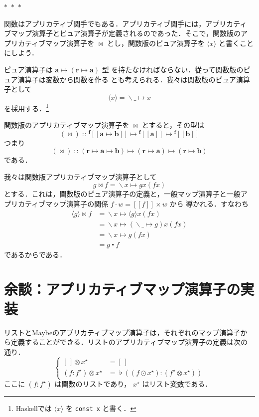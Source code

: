 \documentclass[a5paper,twoside,fleqn,draft]{jsbook}
\def\[{[\![}
\def\]{]\!]}
\newcommand{\separator}{\begin{center}$*$~$*$~$*$\end{center}}
\newcommand{\programminglanguage}[1]{\textsf{#1}}
\newcommand{\haskell}{\programminglanguage{Haskell}}
\newcommand{\code}[1]{\texttt{#1}}
\newcommand{\mEmptyList}{{[\,]}}
\DeclareMathOperator{\mAppMap}{\times}
\DeclareMathOperator{\mAppMapFunc}{\bowtie}
\DeclareMathOperator{\mAppMapList}{\otimes}
\DeclareMathOperator{\mComp}{\centerdot}
\DeclareMathOperator{\mFuncArrow}{\mapsto}
\DeclareMathOperator{\mIn}{{:\!:}}
\DeclareMathOperator{\mJoinList}{\flat} %
\DeclareMathOperator{\mLambda}{\backslash}
\DeclareMathOperator{\mLambdaArrow}{\mapsto}
\DeclareMathOperator{\mMap}{\cdot}
\DeclareMathOperator{\mMapList}{\odot}
\newcommand{\mType}[1]{\mathbf{#1}} %
\newcommand{\mA}{\mType{a}}
\newcommand{\mB}{\mType{b}}
\newcommand{\mR}{\mType{r}}
\newcommand{\mTypeAssemble}[2]{{}^\mType{#1}\[\mType{#2}\]}
\newcommand{\mFuncWith}[1]{\langle#1\rangle}  %
\newcommand{\mPureWith}[1]{\[#1\]}
\newcommand{\mList}[1]{{#1}^\mathrm{\star}}
\newcommand{\mLambdaEXP}[2]{\mLambda{#1}\mLambdaArrow{#2}} %
\newcommand{\mProjEXP}[2]{#1\mFuncArrow#2} %
\begin{document}
\separator

関数はアプリカティブ関手でもある．アプリカティブ関手には，アプリカティ
ブマップ演算子とピュア演算子が定義されるのであった．そこで，関数版のア
プリカティブマップ演算子を $\mAppMapFunc$ とし，関数版のピュア演算子を
$\mFuncWith{x}$ と書くことにしよう．

ピュア演算子は $\mProjEXP{\mA }{(\mProjEXP{\mR}{\mA })}$ 型
を持たなければならない．従って関数版のピュア演算子は変数から関数を作る
とも考えられる．我々は関数版のピュア演算子として
\begin{equation}
  \mFuncWith{x}
  =\mLambdaEXP{\_}{x}
\end{equation}
を採用する．\footnote{\haskell では $\mFuncWith{x}$ を \code{const x} と書く．}

関数版のアプリカティブマップ演算子を $\mAppMapFunc$ とすると，その型は
\begin{equation}
  (\mAppMapFunc)
  \mIn\mTypeAssemble{f}{\mA\mFuncArrow\mB}
  \mFuncArrow\mTypeAssemble{f}{\mA}
  \mFuncArrow\mTypeAssemble{f}{\mB}
\end{equation}
つまり
\begin{equation}
  (\mAppMapFunc)
  \mIn{}(\mR\mFuncArrow\mA\mFuncArrow\mB)
  \mFuncArrow(\mR\mFuncArrow\mA)
  \mFuncArrow(\mR\mFuncArrow\mB)
\end{equation}
である．

我々は関数版アプリカティブマップ演算子として
\begin{equation}
g\mAppMapFunc f=\mLambdaEXP{x}{gx(fx)}
\end{equation}
とする．これは，関数版のピュア演算子の定義と，一般マップ演算子と一般ア
プリカティブマップ演算子の関係 $f\mMap w=\mPureWith{f}\mAppMap w$ から
導かれる．すなわち
\begin{align}
\mFuncWith{g}\mAppMapFunc f
&=\mLambdaEXP{x}{\mFuncWith{g}x(fx)}\\
&=\mLambdaEXP{x}{(\mLambdaEXP{\_}{g})x(fx)}\\
&=\mLambdaEXP{x}{g(fx)}\\
&=g\mComp f
\end{align}
であるからである．

\section{余談：アプリカティブマップ演算子の実装}

リストとMaybeのアプリカティブマップ演算子は，それぞれのマップ演算子か
ら定義することができる．リストのアプリカティブマップ演算子の定義は次の
通り．
\begin{equation}
  \left\{
  \begin{aligned}
    \mEmptyList\mAppMapList\mList{x}
    &=\mEmptyList\\
    (f:\mList{f})\mAppMapList\mList{x}
    &=\mJoinList{}((f\mMapList\mList{x}):(\mList{f}\mAppMapList\mList{x}))
  \end{aligned}
  \right.
\end{equation}
ここに $(f:\mList{f})$ は関数のリストであり， $\mList{x}$ はリスト変数である．
\end{document}

